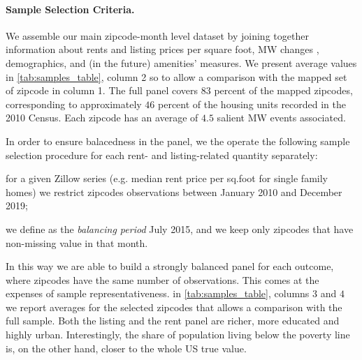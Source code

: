 \paragraph{Sample Selection Criteria.}
We assemble our main zipcode-month level dataset by joining together information about rents and listing prices per square foot, MW changes , demographics, and (in the future) amenities' measures. We present average values in \autoref{tab:samples_table}, column 2 so to allow a comparison with the mapped set of zipcode in column 1. The full panel covers $83$ percent of the mapped zipcodes, corresponding to approximately $46$ percent of the housing units recorded in the 2010 Census. Each zipcode has an average of $4.5$ salient MW events associated. 

In order to ensure balacedness in the panel, we the operate the following sample selection procedure for each rent- and listing-related quantity separately: \begin{enumerate*}
    \item for a given Zillow series (e.g. median rent price per sq.foot for single family homes) we restrict zipcodes observations between January 2010 and December 2019; 
    \item we define as the \textit{balancing period} July 2015, and we keep only zipcodes that have non-missing value in that month. 
\end{enumerate*}
In this way we are able to build a strongly balanced panel for each outcome, where zipcodes have the same number of observations. This comes at the expenses of sample representativeness. in \autoref{tab:samples_table}, columns $3$ and $4$ we report averages for the selected zipcodes that allows a comparison with the full sample. Both the listing and the rent panel are richer, more educated and highly urban. Interestingly, the share of population living below the poverty line is, on the other hand, closer to the whole US true value. 

